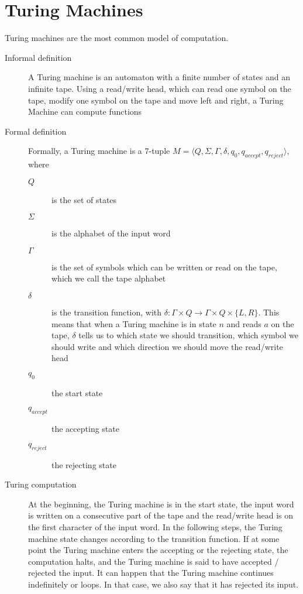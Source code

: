 \section{Turing Machines}\label{sec:turing-machines}
Turing machines are the most common model of computation.
\begin{description}
    \item[Informal definition] A Turing machine is an automaton with a finite number of states and an infinite tape.
    Using a read/write head, which can read one symbol on the tape, modify one symbol on the tape and move left and right, a Turing Machine can compute functions
    \item[Formal definition] Formally, a Turing machine is a 7-tuple $M = \langle  Q, \Sigma, \Gamma, \delta, q_0, q_{accept}, q_{reject}\rangle$, where
    \begin{description}
        \item[$Q$] is the set of states
        \item[$\Sigma$] is the alphabet of the input word
        \item[$\Gamma$] is the set of symbols which can be written or read on the tape, which we call the tape alphabet
        \item[$\delta$] is the transition function, with $\delta : \Gamma \times Q \to \Gamma \times Q \times \{L, R\}$.
        This means that when a Turing machine is in state $n$ and reads $a$ on the tape, $\delta$ tells us to which state we should transition, which symbol we should write and which direction we should move the read/write head
        \item[$q_0$] the start state
        \item[$q_{accept}$] the accepting state
        \item[$q_{reject}$] the rejecting state
    \end{description}
    \item[Turing computation] At the beginning, the Turing machine is in the start state, the input word is written on a consecutive part of the tape and the read/write head is on the first character of the input word.
    In the following steps, the Turing machine state changes according to the transition function.
    If at some point the Turing machine enters the accepting or the rejecting state, the computation halts, and the Turing machine is said to have accepted / rejected the input.
    It can happen that the Turing machine continues indefinitely or loops.
    In that case, we also say that it has rejected its input.

\end{description}
